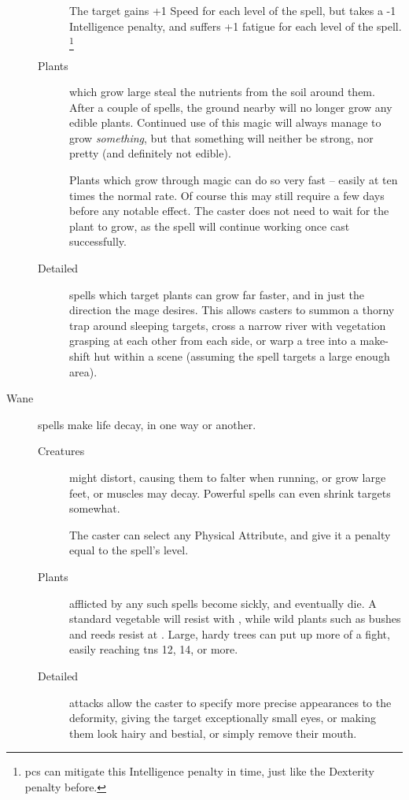 \begin{multicols}{2}
\begin{description}
\begin{description}
        The target gains +1 Speed for each level of the spell, but takes a -1 Intelligence penalty, and suffers +1 \gls{fatigue} for each level of the spell.%
        \footnote{\Glspl{pc} can mitigate this Intelligence penalty in time, just like the Dexterity penalty before.}
      \item[Plants]
        which grow large steal the nutrients from the soil around them.
        After a couple of spells, the ground nearby will no longer grow any edible plants.
        Continued use of this magic will always manage to grow \emph{something}, but that something will neither be strong, nor pretty (and definitely not edible).

        Plants which grow through magic can do so very fast -- easily at ten times the normal rate.
        Of course this may still require a few days before any notable effect.
        The caster does not need to wait for the plant to grow, as the spell will continue working once cast successfully.
      \item[Detailed]
        spells which target plants can grow far faster, and in just the direction the mage desires.
        This allows casters to summon a thorny trap around sleeping targets, cross a narrow river with vegetation grasping at each other from each side, or warp a tree into a make-shift hut within a scene (assuming the spell targets a large enough area).
    \end{description}
  \item[Wane]
  spells make life decay, in one way or another.
    \begin{description}
      \item[Creatures]
        might distort, causing them to falter when running, or grow large feet, or muscles may decay.
        Powerful spells can even shrink targets somewhat.

        The caster can select any Physical Attribute, and give it a penalty equal to the spell's level.
      \item[Plants]
        afflicted by any such spells become sickly, and eventually die.
        A standard vegetable will resist with \tn[4], while wild plants such as bushes and reeds resist at \tn[7].
        Large, hardy trees can put up more of a fight, easily reaching \glspl{tn} 12, 14, or more.
      \item[Detailed]
        attacks allow the caster to specify more precise appearances to the deformity, giving the target exceptionally small eyes, or making them look hairy and bestial, or simply remove their mouth.


\end{description}
\end{description}
\end{multicols}
